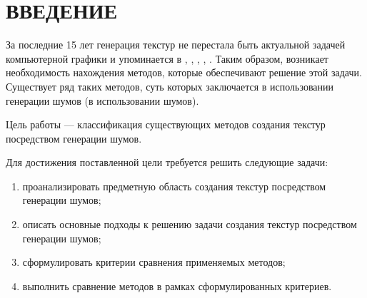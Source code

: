 \chapter*{ВВЕДЕНИЕ}

За последние 15 лет генерация текстур не перестала быть актуальной задачей компьютерной графики и упоминается в 
\cite{8942651}, \cite{10042545}, \cite{TRINCHAOANDRADE201228}, \cite{doi:10.1080/15394450902996601}, \cite{Groueix_2018_CVPR}.
Таким образом, возникает необходимость нахождения методов, которые обеспечивают решение этой задачи.
Существует ряд таких методов, суть которых заключается в использовании генерации шумов (в использовании шумов).

Цель работы --- классификация существующих методов создания текстур посредством генерации шумов.

Для достижения поставленной цели требуется решить следующие задачи:
\begin{enumerate}
	\item проанализировать предметную область создания текстур посредством генерации шумов;
	\item описать основные подходы к решению задачи создания текстур посредством генерации шумов;
	\item сформулировать критерии сравнения применяемых методов;
	\item выполнить сравнение методов в рамках сформулированных критериев.
\end{enumerate}